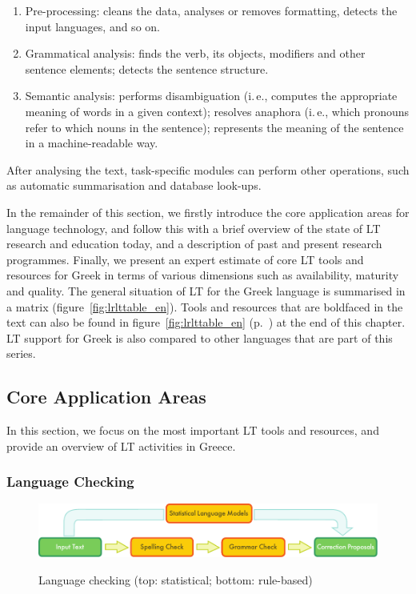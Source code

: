 \begin{multicols}{2}
\begin{enumerate}
\item Pre-processing: cleans the data, analyses or removes formatting, detects the input languages, and so on.
\item Grammatical analysis: finds the verb, its objects, modifiers and other sentence elements; detects the sentence structure.
\item Semantic analysis: performs disambiguation (i.\,e., computes the appropriate meaning of words in a given context); resolves anaphora (i.\,e., which pronouns refer to which nouns in the sentence); represents the meaning of the sentence in a machine-readable way.
\end{enumerate}

After analysing the text, task-specific modules can perform other operations, such as automatic summarisation and database look-ups.

In the remainder of this section, we firstly introduce the core application areas for language technology, and follow this with a brief overview of the state of LT research and education today, and a description of past and present research programmes. Finally, we present an expert estimate of core LT tools and resources for Greek in terms of various dimensions such as availability, maturity and quality. The general situation of LT for the Greek language is summarised in a matrix (figure~\ref{fig:lrlttable_en}). Tools and resources that are boldfaced in the text can also be found in figure~\ref{fig:lrlttable_en} (p.~\pageref{fig:lrlttable_en}) at the end of this chapter. LT support for Greek is also compared to other languages that are part of this series.

\subsection{Core Application Areas}

In this section, we focus on the most important LT tools and resources, and provide an overview of LT activities in Greece.

\subsubsection{Language Checking}

\begin{figure}[t]
  \center
  \includegraphics[width=\textwidth]{../_media/english/language_checking}
  \caption{Language checking (top: statistical; bottom: rule-based)}
   \label{fig:langcheckingaarch_en}
\end{figure}


\end{multicols}
